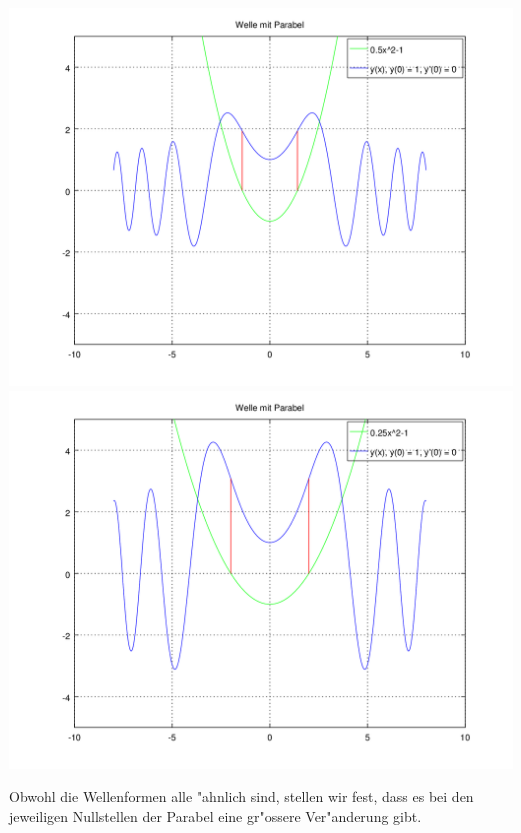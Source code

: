 \noindent
\includegraphics[scale=0.35]{./wellen/images/vara/ahalbe.png}
\includegraphics[scale=0.35]{./wellen/images/vara/aviertel.png}

Obwohl die Wellenformen alle "ahnlich sind, stellen wir fest, dass es bei den 
jeweiligen Nullstellen der Parabel eine gr"ossere Ver"anderung gibt.
